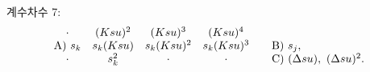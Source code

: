 
\noindent 계수차수 7:
\[
\begin{array}{c@{\quad}c@{\quad}c@{\quad}c@{\qquad}l}
\cdot&(Ksu)^2&(Ksu)^3&(Ksu)^4&\\
\text{A)}\ s_k&s_k(Ksu)&s_k(Ksu)^2&s_k(Ksu)^3&
\text{B)}\ s_j,\\
\cdot&s_k^2&\cdot&\cdot&
\text{C)}\ (\Delta su),\ (\Delta su)^2.
\end{array}
\]
